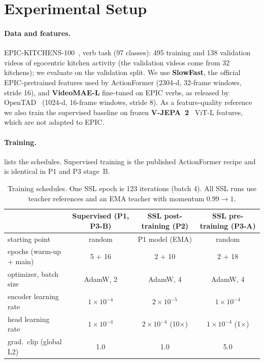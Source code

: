 \documentclass[10pt,a4paper]{article}
\begin{document}
\section{Experimental Setup}\label{sec:setup}

\paragraph{Data and features.} EPIC-KITCHENS-100~\cite{damen2022epic}, verb task
(97 classes): 495 training and 138 validation videos of egocentric kitchen activity
(the validation videos come from 32 kitchens); we evaluate on the validation split. We use
\textbf{SlowFast}, the official EPIC-pretrained features used by ActionFormer (2304-d,
32-frame windows, stride 16), and \textbf{VideoMAE-L} fine-tuned on EPIC verbs, as released
by OpenTAD~\cite{liu2025opentad} (1024-d, 16-frame windows, stride 8). As a feature-quality
reference we also train the supervised baseline on frozen
\textbf{V-JEPA~2}~\cite{assran2025vjepa2} ViT-L features, which are not adapted to EPIC.

\paragraph{Training.}  lists the schedules. Supervised training is the
published ActionFormer recipe and is identical in P1 and P3 stage~B.

\begin{table}[t]
\centering\small
\caption{Training schedules. One SSL epoch is 123 iterations (batch 4). All SSL runs use
teacher references and an EMA teacher with momentum $0.99\rightarrow1$.}
\label{tab:hparams}
\begin{tabular}{lccc}
\toprule
 & Supervised (P1, P3-B) & SSL post-training (P2) & SSL pre-training (P3-A) \\
\midrule
starting point & random & P1 model (EMA) & random \\
epochs (warm-up + main) & 5 + 16 & 2 + 10 & 2 + 18 \\
optimizer, batch size & AdamW, 2 & AdamW, 4 & AdamW, 4 \\
encoder learning rate & $1{\times}10^{-4}$ & $2{\times}10^{-5}$ & $1{\times}10^{-4}$ \\
head learning rate & $1{\times}10^{-4}$ & $2{\times}10^{-4}$ (10$\times$) & $1{\times}10^{-4}$ (1$\times$) \\
grad.\ clip (global L2) & 1.0 & 1.0 & 5.0 \\
\bottomrule
\end{tabular}
\end{table}
\end{document}
